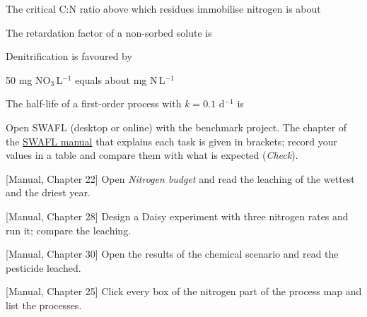 \begin{exlist}
\item The critical C:N ratio above which residues immobilise nitrogen is about
\item The retardation factor of a non-sorbed solute is
\item Denitrification is favoured by
\item 50 mg NO$_3$\,L$^{-1}$ equals about mg N\,L$^{-1}$
\item The half-life of a first-order process with $k=0.1$ d$^{-1}$ is
\end{exlist}
{\small Open SWAFL (desktop or online) with the benchmark project. The chapter of the \href{https://github.com/halilunaziru73-creator/Coupled-Water-Fluxes-Pore-Scale-Dynamics-Precision-Irrigation-Mulching-Feedback-Loops/raw/main/Software/v1.1.0/SWAFL_Desktop/docs/manual_v1.1.0/SWAFL_Manual_v1.1.0.pdf}{SWAFL manual} that explains each task is given in brackets; record your values in a table and compare them with what is expected (\emph{Check}).}\par\vspace{3pt}
\begin{exlist}
\item {\color{khblue}[Manual, Chapter 22]} Open \emph{Nitrogen budget} and read the leaching of the wettest and the driest year.\par{}
\item {\color{khblue}[Manual, Chapter 28]} Design a Daisy experiment with three nitrogen rates and run it; compare the leaching.\par{}
\item {\color{khblue}[Manual, Chapter 30]} Open the results of the chemical scenario and read the pesticide leached.\par{}
\item {\color{khblue}[Manual, Chapter 25]} Click every box of the nitrogen part of the process map and list the processes.\par{}
\end{exlist}
